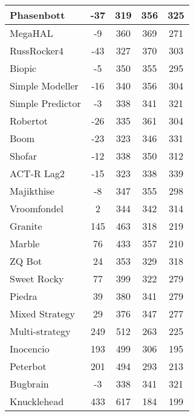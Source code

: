 \begin{table}
\begin{tabular}{|l|c|c|c|c|}
Phasenbott & -37 & 319 & 356 & 325 \\ \hline 
MegaHAL & -9 & 360 & 369 & 271 \\ \hline 
RussRocker4 & -43 & 327 & 370 & 303 \\ \hline 
Biopic & -5 & 350 & 355 & 295 \\ \hline 
Simple Modeller & -16 & 340 & 356 & 304 \\ \hline 
Simple Predictor & -3 & 338 & 341 & 321 \\ \hline 
Robertot & -26 & 335 & 361 & 304 \\ \hline 
Boom & -23 & 323 & 346 & 331 \\ \hline 
Shofar & -12 & 338 & 350 & 312 \\ \hline 
ACT-R Lag2 & -15 & 323 & 338 & 339 \\ \hline 
Majikthise & -8 & 347 & 355 & 298 \\ \hline 
Vroomfondel & 2 & 344 & 342 & 314 \\ \hline 
\rowcolor{HighlightRowColor} Granite & 145 & 463 & 318 & 219 \\ \hline 
\rowcolor{HighlightRowColor} Marble & 76 & 433 & 357 & 210 \\ \hline 
ZQ Bot & 24 & 353 & 329 & 318 \\ \hline 
\rowcolor{HighlightRowColor} Sweet Rocky & 77 & 399 & 322 & 279 \\ \hline 
Piedra & 39 & 380 & 341 & 279 \\ \hline 
Mixed Strategy & 29 & 376 & 347 & 277 \\ \hline 
\rowcolor{HighlightRowColor} Multi-strategy & 249 & 512 & 263 & 225 \\ \hline 
\rowcolor{HighlightRowColor} Inocencio & 193 & 499 & 306 & 195 \\ \hline 
\rowcolor{HighlightRowColor} Peterbot & 201 & 494 & 293 & 213 \\ \hline 
Bugbrain & -3 & 338 & 341 & 321 \\ \hline 
\rowcolor{HighlightRowColor} Knucklehead & 433 & 617 & 184 & 199 \\ \hline
        \end{tabular}
    \end{table}